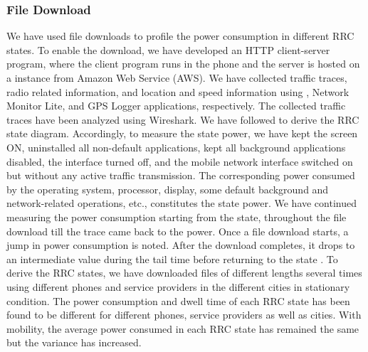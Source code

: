 \subsubsection{File Download} We have used file downloads to profile the power consumption in different \ac{RRC} states. To enable the download, we have developed  an \ac{HTTP} client-server program, where the client program runs in the phone and the server  is hosted on a instance from Amazon Web Service (AWS). We have collected traffic traces, radio related information, and location and speed information using , Network Monitor Lite, and GPS Logger applications, respectively. The collected traffic traces have been analyzed using Wireshark. We have followed \cite{Yang2018} to derive  the \ac{RRC} state diagram. Accordingly, to measure the  state power, we have kept the screen ON, uninstalled all non-default applications, kept all background applications disabled, the  interface turned off, and the mobile network interface switched on but without any active traffic transmission. The corresponding power consumed by the operating system, processor, display, some default background and network-related operations, etc., constitutes the  state power.  We have continued measuring the power consumption starting from the  state, throughout the file download till the trace came back to the  power. Once a file download starts, a jump in power consumption is noted. After the download completes, it drops to an intermediate value during the tail time before returning to the  state \cite{Yang2018}. To derive the \ac{RRC} states, we have downloaded files of different lengths several times using different phones and service providers in the different cities in stationary condition. The power consumption and dwell time of each \ac{RRC} state has been found to be different for different phones, service providers as well as cities. With mobility, the average power consumed in each \ac{RRC} state has remained the same  but the variance has increased.


